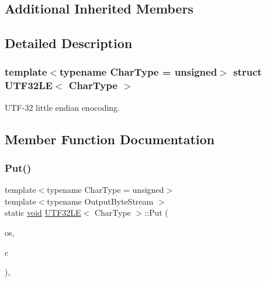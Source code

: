 \subsection*{Additional Inherited Members}


\subsection{Detailed Description}
\subsubsection*{template$<$typename Char\+Type = unsigned$>$\newline
struct U\+T\+F32\+L\+E$<$ Char\+Type $>$}

U\+T\+F-\/32 little endian enocoding. 

\subsection{Member Function Documentation}
\mbox{\label{structUTF32LE_a61bb50e7fba27e3fe28a9f30eb366193}} 
\subsubsection{\texorpdfstring{Put()}{Put()}}
{\footnotesize\ttfamily template$<$typename Char\+Type  = unsigned$>$ \\
template$<$typename Output\+Byte\+Stream $>$ \\
static \hyperlink{imgui__impl__opengl3__loader_8h_ac668e7cffd9e2e9cfee428b9b2f34fa7}{void} \hyperlink{structUTF32LE}{U\+T\+F32\+LE}$<$ Char\+Type $>$\+::Put (\begin{DoxyParamCaption}\item[{Output\+Byte\+Stream \&}]{os,  }\item[{Char\+Type}]{c }\end{DoxyParamCaption})\hspace{0.3cm}{\ttfamily [inline]}, {\ttfamily [static]}}

\mbox{\label{structUTF32LE_accd97d45e55746c900dab356605825be}} 

